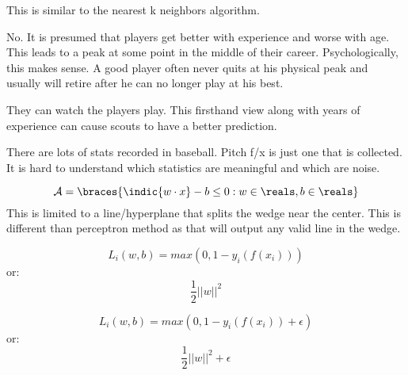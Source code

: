 \documentclass[12pt]{article}
\begin{document}
\begin{enumerate}

This is similar to the nearest k neighbors algorithm. 


No. It is presumed that players get better with experience and worse with age. This leads to a peak at some point in the middle of their career. Psychologically, this makes sense. A good player often never quits at his physical peak and usually will retire after he can no longer play at his best. 


They can watch the players play. This firsthand view along with years of experience can cause scouts to have a better prediction.


There are lots of stats recorded in baseball. Pitch f/x is just one that is collected. It is hard to understand which statistics are meaningful and which are noise.  

\end{enumerate}




\begin{enumerate}


$$\mathcal{A} = \braces{\indic {w \cdot x}-b \leq 0 : w \in \reals, b \in \reals}$$
This is limited to a line/hyperplane that splits the wedge near the center. This is different than perceptron method as that will output any valid line in the wedge.


$$L_i(w,b) = max(0,1-y_i(f(x_i)))$$
or:
$$\frac{1}{2}||w||^2$$


$$L_i(w,b) = max(0,1-y_i(f(x_i))+\epsilon)$$
or:
$$\frac{1}{2}||w||^2 + \epsilon$$

\end{enumerate}
\end{document}
